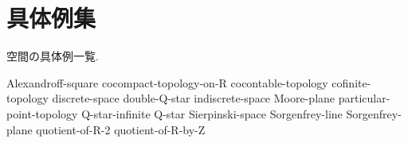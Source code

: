 \documentclass[uplatex, dvipdfmx, a4paper, 12pt, class=jsbook, crop=false]{standalone}
\begin{document}
\chapter{具体例集}
\label{chap:examples}

空間の具体例一覧.

{Alexandroff-square}
{cocompact-topology-on-R}
{cocontable-topology}
{cofinite-topology}
{discrete-space}
{double-Q-star}
{indiscrete-space}
{Moore-plane}
{particular-point-topology}
{Q-star-infinite}
{Q-star}
{Sierpinski-space}
{Sorgenfrey-line}
{Sorgenfrey-plane}
{quotient-of-R-2}
{quotient-of-R-by-Z}
\end{document}
